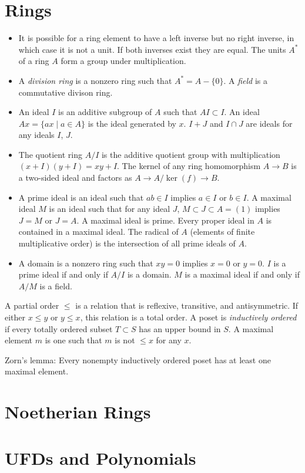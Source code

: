 \documentclass{article}
\begin{document}
\section{Rings}
\begin{itemize}
  \item{
    It is possible for a ring element to have a left inverse but no
    right inverse, in which case it is not a unit. If both inverses
    exist they are equal. The units $A^\ast$ of a ring $A$ form a
    group under multiplication.
  }
  \item{
    A \emph{division ring} is a nonzero ring such that $A^\ast = A -
    \{ 0 \}$. A \emph{field} is a commutative divison ring.
  }
  \item{
    An ideal $I$ is an additive subgroup of $A$ such that
    $AI \subset I$. An ideal $Ax = \{ax \mid a \in A\}$ is the ideal
    generated by $x$. $I + J$ and $I \cap J$ are ideals for any ideals
    $I$, $J$.
  }
  \item{
    The quotient ring $A / I$ is the additive quotient group with
    multiplication $(x + I)(y + I) = xy + I$. The kernel of any ring
    homomorphism $A \to B$ is a two-sided ideal and factors as
    $A \to A / \ker(f) \to B$.
  }
  \item{
    A prime ideal is an ideal such that $ab \in I$ implies $a \in I$
    or $b \in I$. A maximal ideal $M$ is an ideal such that for any
    ideal $J$, $M \subset J \subset A = (1)$ implies $J = M$ or
    $J = A$. A maximal ideal is prime. Every proper ideal in $A$ is
    contained in a maximal ideal. The radical of $A$ (elements of
    finite multiplicative order) is the intersection of all prime
    ideals of $A$.
  }
  \item{
    A domain is a nonzero ring such that $xy = 0$ implies $x = 0$ or
    $y = 0$. $I$ is a prime ideal if and only if $A / I$ is a
    domain. $M$ is a maximal ideal if and only if $A / M$ is a field.
  }
\end{itemize}

A partial order $\leq$ is a relation that is reflexive, transitive, and
antisymmetric. If either $x \leq y$ or $y \leq x$, this relation is a
total order. A poset is \emph{inductively ordered} if every totally
ordered subset $T \subset S$ has an upper bound in $S$. A maximal
element $m$ is one such that $m$ is not $\leq x$ for any $x$.

Zorn's lemma: Every nonempty inductively ordered poset has at least
one maximal element.


\section{Noetherian Rings}

\section{UFDs and Polynomials}
\end{document}
